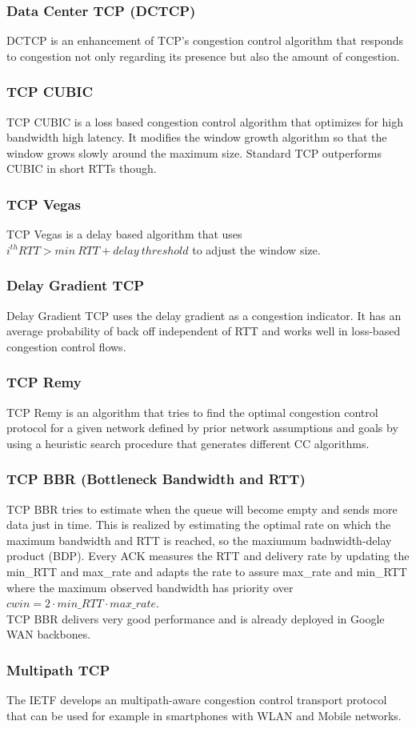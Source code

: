 \subsubsection*{Data Center TCP (DCTCP)}
DCTCP is an enhancement of TCP's congestion control algorithm that responds to congestion not only regarding its presence but also the amount of congestion.

\subsubsection*{TCP CUBIC}
TCP CUBIC is a loss based congestion control algorithm that optimizes for high bandwidth high latency.
It modifies the window growth algorithm so that the window grows slowly around the maximum size.
Standard TCP outperforms CUBIC in short RTTs though.

\subsubsection*{TCP Vegas}
TCP Vegas is a delay based algorithm that uses $i^{th} RTT > min~RTT + delay~threshold$ to adjust the window size.

\subsubsection*{Delay Gradient TCP}
Delay Gradient TCP uses the delay gradient as a congestion indicator.
It has an average probability of back off independent of RTT and works well in loss-based congestion control flows.

\subsubsection*{TCP Remy}
TCP Remy is an algorithm that tries to find the optimal congestion control protocol for a given network defined by prior network assumptions and goals by using a heuristic search procedure that generates different CC algorithms.

\subsubsection*{TCP BBR (Bottleneck Bandwidth and RTT)}
TCP BBR tries to estimate when the queue will become empty and sends more data just in time.
This is realized by estimating the optimal rate on which the maximum bandwidth and RTT is reached, so the maxiumum badnwidth-delay product (BDP).
Every ACK measures the RTT and delivery rate by updating the min\_RTT and max\_rate and adapts the rate to assure max\_rate and min\_RTT where the maximum observed bandwidth has priority over $cwin = 2 \cdot min\_RTT \cdot max\_rate$.\\
TCP BBR delivers very good performance and is already deployed in Google WAN backbones.

\subsubsection*{Multipath TCP}
The IETF develops an multipath-aware congestion control transport protocol that can be used for example in smartphones with WLAN and Mobile networks.

